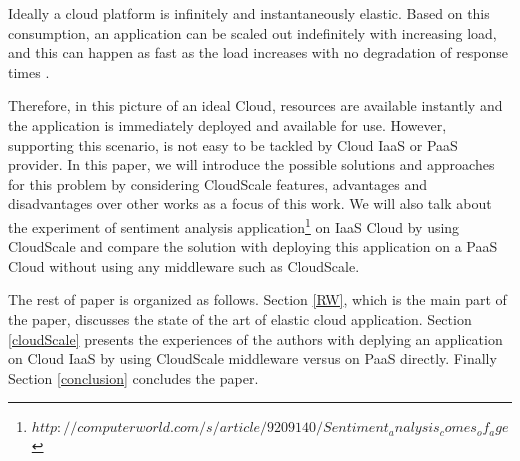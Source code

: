\documentclass{sig-alternate}
\begin{document}
Ideally a cloud platform is infinitely and instantaneously elastic. Based on this consumption, an application can be scaled out indefinitely with increasing load, and this can happen as fast as the load increases with no degradation of response times \cite{brebner2012your}. 

Therefore, in this picture of an ideal Cloud, resources are available instantly and the application is immediately deployed and available for use. However, supporting this scenario, is not easy to be tackled by Cloud IaaS or PaaS provider. In this paper, we will introduce the possible solutions and approaches for this problem by considering CloudScale \cite{leitner2012cloudscale} features, advantages and disadvantages over other works as a focus of this work. We will also talk about the experiment of sentiment analysis application\footnote{$http://computerworld.com/s/article/9209140/Sentiment_analysis_comes_of_age$} on IaaS Cloud by using CloudScale and compare the solution with deploying this application on a PaaS Cloud without using any middleware such as CloudScale.

The rest of paper is organized as follows. Section \ref{RW}, which is the main part of the paper, discusses the state of the art of elastic cloud application. Section \ref{cloudScale} presents the experiences of the authors with deplying an application on Cloud IaaS by using CloudScale middleware versus on PaaS directly. Finally Section \ref{conclusion} concludes the paper.
\end{document}
